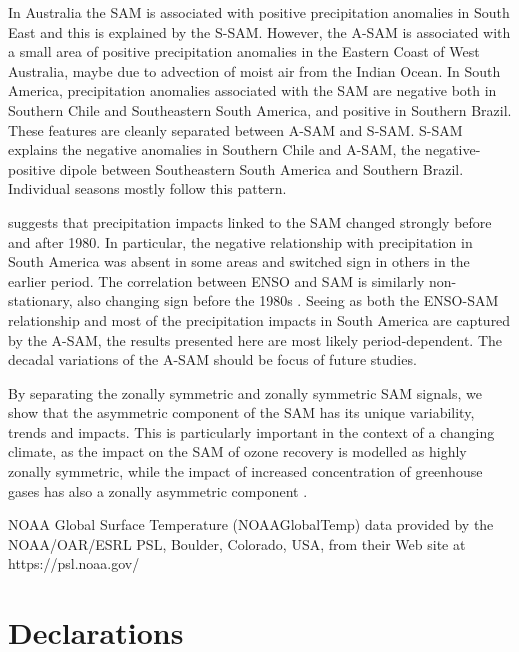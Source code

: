 \documentclass[smallextended]{svjour3}       %
\begin{document}
In Australia the SAM is associated with positive precipitation anomalies in South East and this is explained by the S\nobreakdash-SAM. However, the A\nobreakdash-SAM is associated with a small area of positive precipitation anomalies in the Eastern Coast of West Australia, maybe due to advection of moist air from the Indian Ocean. In South America, precipitation anomalies associated with the SAM are negative both in Southern Chile and Southeastern South America, and positive in Southern Brazil. These features are cleanly separated between A\nobreakdash-SAM and S\nobreakdash-SAM. S\nobreakdash-SAM explains the negative anomalies in Southern Chile and A\nobreakdash-SAM, the negative-positive dipole between Southeastern South America and Southern Brazil. Individual seasons mostly follow this pattern.

\citet{silvestri2009} suggests that precipitation impacts linked to the SAM changed strongly before and after 1980. In particular, the negative relationship with precipitation in South America was absent in some areas and switched sign in others in the earlier period. The correlation between ENSO and SAM is similarly non-stationary, also changing sign before the 1980s \citep{fogt2006, clem2013}. Seeing as both the ENSO\nobreakdash-SAM relationship and most of the precipitation impacts in South America are captured by the A\nobreakdash-SAM, the results presented here are most likely period-dependent. The decadal variations of the A\nobreakdash-SAM should be focus of future studies.

By separating the zonally symmetric and zonally symmetric SAM signals, we show that the asymmetric component of the SAM has its unique variability, trends and impacts. This is particularly important in the context of a changing climate, as the impact on the SAM of ozone recovery is modelled as highly zonally symmetric, while the impact of increased concentration of greenhouse gases has also a zonally asymmetric component \citep{arblaster2006}.

\begin{acknowledgements}
NOAA Global Surface Temperature (NOAAGlobalTemp) data provided by the NOAA/OAR/ESRL PSL, Boulder, Colorado, USA, from their Web site at https://psl.noaa.gov/ 
\end{acknowledgements}

\hypertarget{declarations}{%
\section*{Declarations}\label{declarations}}
\end{document}

